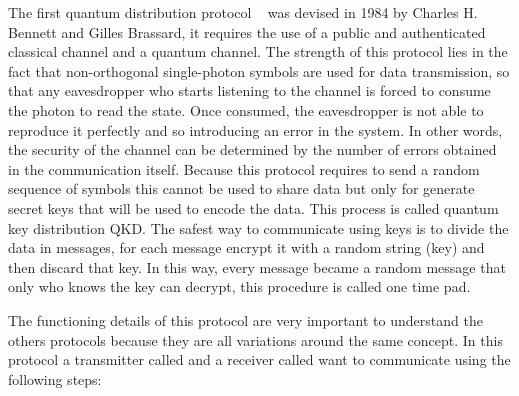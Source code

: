The first quantum distribution protocol ~\cite{a9} was devised in 1984 by Charles H. Bennett and Gilles Brassard, it requires the use of a public and authenticated classical channel and a quantum channel. The strength of this protocol lies in the fact that non-orthogonal single-photon symbols are used for data transmission, so that any eavesdropper who starts listening to the channel is forced to consume the photon to read the state. Once consumed, the eavesdropper is not able to reproduce it perfectly and so introducing an error in the system. In other words, the security of the channel can be determined by the number of errors obtained in the communication itself. Because this protocol requires to send a random sequence of symbols this cannot be used to share data but only for generate secret keys that will be used to encode the data. This process is called quantum key distribution QKD. The safest way to communicate using keys is to divide the data in messages, for each message encrypt it with a random string (key) and then discard that key. In this way, every message became a random message that only who knows the key can decrypt, this procedure is called one time pad.

The functioning details of this protocol are very important to understand the others protocols because they are all variations around the same concept. In this protocol a transmitter called  and a receiver called  want to communicate using the following steps:

